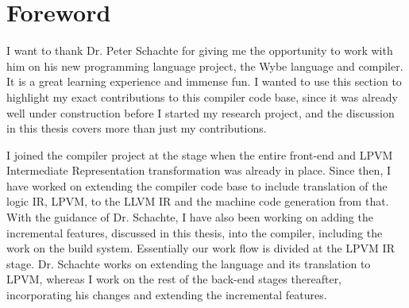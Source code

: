 \chapter*{Foreword}

I want to thank Dr. Peter Schachte for giving me the opportunity to work with
him on his new programming language project, the Wybe language and compiler. It
is a great learning experience and immense fun. I wanted to use this section to
highlight my exact contributions to this compiler code base, since it was
already well under construction before I started my research project, and the
discussion in this thesis covers more than just my contributions.

I joined the compiler project at the stage when the entire front-end and LPVM
Intermediate Representation transformation was already in place. Since then, I
have worked on extending the compiler code base to include translation of the
logic IR, LPVM, to the LLVM IR and the machine code generation from that. With
the guidance of Dr. Schachte, I have also been working on adding the
incremental features, discussed in this thesis, into the compiler, including
the work on the build system. Essentially our work flow is divided at the LPVM
IR stage. Dr. Schachte works on extending the language and its translation to
LPVM, whereas I work on the rest of the back-end stages thereafter,
incorporating his changes and extending the incremental features.


